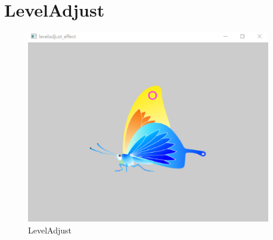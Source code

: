 ﻿




\FloatBarrier
\section{
LevelAdjust
}\label{c000015s000009}


\begin{figure}[htb] %
\marginnote{\setlength\fboxsep{2pt}\fbox{\footnotesize{\kaishu\figurename\,}\footnotesize{\ref{p000025}}}}\centering %
\includegraphics[width=0.95\textwidth]{the_book_image/p000025.eps} %
\caption{LevelAdjust} %
\label{p000025} %
\end{figure}


